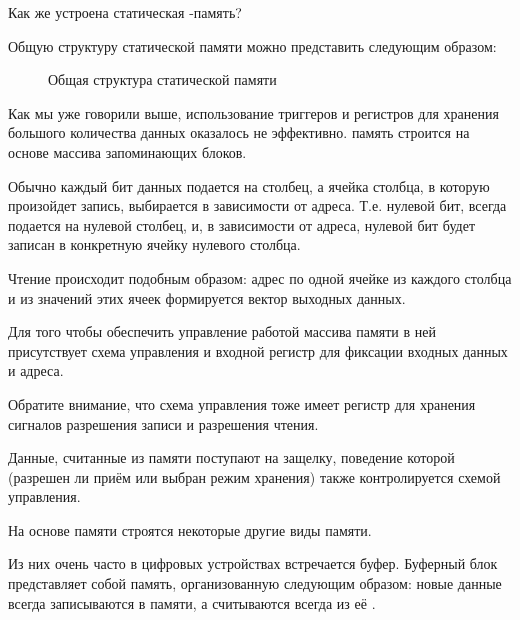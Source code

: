 \par{Как же устроена статическая -память?}

\par{Общую структуру статической памяти можно представить следующим образом:}

\begin{figure}[H]
	\centering
	\def\svgwidth{\columnwidth}
	
	\caption{Общая структура статической памяти}
\end{figure}

\par{Как мы уже говорили выше, использование триггеров и регистров для хранения большого количества данных оказалось не эффективно.  память строится на основе массива запоминающих блоков.}

\par{Обычно каждый бит данных подается на столбец, а ячейка столбца, в которую произойдет запись, выбирается в зависимости от адреса. Т.е. нулевой бит, всегда подается на нулевой столбец, и, в зависимости от адреса, нулевой бит будет записан в конкретную ячейку нулевого столбца.}

\par{Чтение происходит подобным образом: адрес  по одной ячейке из каждого столбца и из значений этих ячеек формируется вектор выходных данных.}

\par{Для того чтобы обеспечить управление работой массива памяти в ней присутствует схема управления и входной регистр для фиксации входных данных и адреса.}

\par{Обратите внимание, что схема управления тоже имеет регистр для хранения сигналов разрешения записи и разрешения чтения.}

\par{Данные, считанные из памяти поступают на защелку, поведение которой (разрешен ли приём или выбран режим хранения) также контролируется схемой управления.}

\par{На основе  памяти строятся некоторые другие виды памяти.}

\par{Из них очень часто в цифровых устройствах встречается буфер. Буферный блок представляет собой память, организованную следующим образом: новые данные всегда записываются в  памяти, а считываются всегда из её .}

